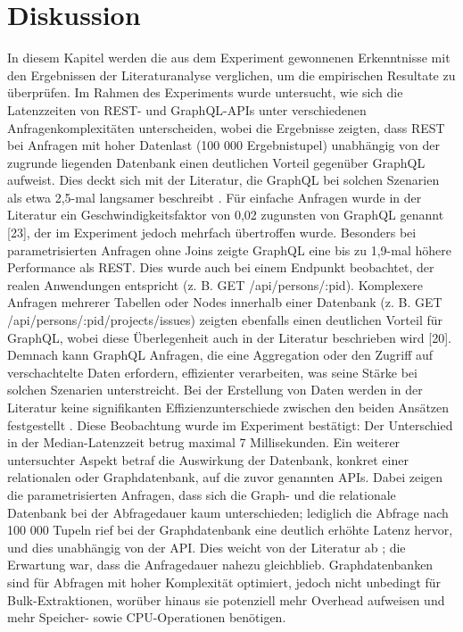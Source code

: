 \chapter{Diskussion} %
\label{sec:diskussion}
In diesem Kapitel werden die aus dem Experiment gewonnenen Erkenntnisse mit den Ergebnissen der Literaturanalyse verglichen, um die empirischen Resultate zu überprüfen.
\newline
\noindent
Im Rahmen des Experiments wurde untersucht, wie sich die Latenzzeiten von REST- und GraphQL-APIs unter verschiedenen Anfragenkomplexitäten unterscheiden, wobei die Ergebnisse zeigten, dass REST bei Anfragen mit hoher Datenlast (100 000 Ergebnistupel) unabhängig von der zugrunde liegenden Datenbank einen deutlichen Vorteil gegenüber GraphQL aufweist. Dies deckt sich mit der Literatur, die GraphQL bei solchen Szenarien als etwa 2,5-mal langsamer beschreibt \citep{restvsgraphql}.
\newline
\noindent
Für einfache Anfragen wurde in der Literatur ein Geschwindigkeitsfaktor von 0,02 zugunsten von GraphQL genannt [23], der im Experiment jedoch mehrfach übertroffen wurde. Besonders bei parametrisierten Anfragen ohne Joins zeigte GraphQL eine bis zu 1,9-mal höhere Performance als REST. Dies wurde auch bei einem Endpunkt beobachtet, der realen Anwendungen entspricht (z. B. GET /api/persons/:pid).
\newline
\noindent
Komplexere Anfragen mehrerer Tabellen oder Nodes innerhalb einer Datenbank (z. B. GET /api/persons/:pid/projects/issues) zeigten ebenfalls einen deutlichen Vorteil für GraphQL, wobei diese Überlegenheit auch in der Literatur beschrieben wird [20]. Demnach kann GraphQL Anfragen, die eine Aggregation oder den Zugriff auf verschachtelte Daten erfordern, effizienter verarbeiten, was seine Stärke bei solchen Szenarien unterstreicht.
\newline
\noindent
Bei der Erstellung von Daten werden in der Literatur keine signifikanten Effizienzunterschiede zwischen den beiden Ansätzen festgestellt \citep{graphqlreplacerest}. Diese Beobachtung wurde im Experiment bestätigt: Der Unterschied in der Median-Latenzzeit betrug maximal 7 Millisekunden.
\newline
\noindent
Ein weiterer untersuchter Aspekt betraf die Auswirkung der Datenbank, konkret einer relationalen oder Graphdatenbank, auf die zuvor genannten APIs. Dabei zeigen die parametrisierten Anfragen, dass sich die Graph- und die relationale Datenbank bei der Abfragedauer kaum unterschieden; lediglich die Abfrage nach 100 000 Tupeln rief bei der Graphdatenbank eine deutlich erhöhte Latenz hervor, und dies unabhängig von der API. Dies weicht von der Literatur ab \citep{graphrelationaldb}; die Erwartung war, dass die Anfragedauer nahezu gleichblieb. Graphdatenbanken sind für Abfragen mit hoher Komplexität optimiert, jedoch nicht unbedingt für Bulk-Extraktionen, worüber hinaus sie potenziell mehr Overhead aufweisen und mehr Speicher- sowie CPU-Operationen benötigen.
